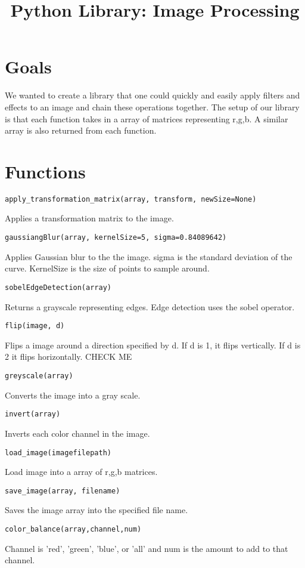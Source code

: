 \documentclass[11pt]{article}
\title{\textbf{Python Library: Image Processing}}
\author{}
\date{}
\begin{document}
\maketitle

\section{Goals}
We wanted to create a library that one could quickly and easily apply filters and effects to an image and chain these operations together. The setup of our library is that each function takes in a array of matrices representing r,g,b. A similar array is also returned from each function.

\section{Functions}
\begin{verbatim}
apply_transformation_matrix(array, transform, newSize=None)
\end{verbatim}
Applies a transformation matrix to the image.
\begin{verbatim}
gaussiangBlur(array, kernelSize=5, sigma=0.84089642)
\end{verbatim}
Applies Gaussian blur to the the image. sigma is the standard deviation of the curve. KernelSize is the size of points to sample around.
\begin{verbatim}
sobelEdgeDetection(array)
\end{verbatim}
Returns a grayscale representing edges. Edge detection uses the sobel operator.
\begin{verbatim}
flip(image, d)
\end{verbatim}
Flips a image around a direction specified by d. If d is 1, it flips vertically. If d is 2 it flips horizontally.
CHECK ME

\begin{verbatim}
greyscale(array)
\end{verbatim}
Converts the image into a gray scale. 
\begin{verbatim}
invert(array)
\end{verbatim}
Inverts each color channel in the image. 

\begin{verbatim}
load_image(imagefilepath)
\end{verbatim}

Load image into a array of r,g,b matrices. 

\begin{verbatim}
save_image(array, filename)
\end{verbatim}

Saves the image array into the specified file name.

\begin{verbatim}
color_balance(array,channel,num)
\end{verbatim}
Channel is 'red', 'green', 'blue', or 'all' and num is the amount to add to that channel.
\end{document}
